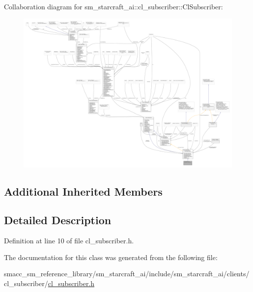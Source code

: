 Collaboration diagram for sm\+\_\+starcraft\+\_\+ai\+:\+:cl\+\_\+subscriber\+:\+:Cl\+Subscriber\+:
\nopagebreak
\begin{figure}[H]
\begin{center}
\leavevmode
\includegraphics[width=350pt]{classsm__starcraft__ai_1_1cl__subscriber_1_1ClSubscriber__coll__graph}
\end{center}
\end{figure}
\subsection*{Additional Inherited Members}


\subsection{Detailed Description}


Definition at line 10 of file cl\+\_\+subscriber.\+h.



The documentation for this class was generated from the following file\+:\begin{DoxyCompactItemize}
\item 
smacc\+\_\+sm\+\_\+reference\+\_\+library/sm\+\_\+starcraft\+\_\+ai/include/sm\+\_\+starcraft\+\_\+ai/clients/cl\+\_\+subscriber/\hyperlink{sm__starcraft__ai_2include_2sm__starcraft__ai_2clients_2cl__subscriber_2cl__subscriber_8h}{cl\+\_\+subscriber.\+h}\end{DoxyCompactItemize}
